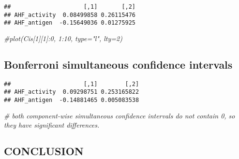 \documentclass[]{article}
\newenvironment{Shaded}{\begin{snugshade}}{\end{snugshade}}
\newcommand{\CommentTok}[1]{\textcolor[rgb]{0.56,0.35,0.01}{\textit{#1}}}
\newcommand{\DecValTok}[1]{\textcolor[rgb]{0.00,0.00,0.81}{#1}}
\newcommand{\KeywordTok}[1]{\textcolor[rgb]{0.13,0.29,0.53}{\textbf{#1}}}
\newcommand{\NormalTok}[1]{#1}
\newcommand{\OperatorTok}[1]{\textcolor[rgb]{0.81,0.36,0.00}{\textbf{#1}}}
\newcommand{\StringTok}[1]{\textcolor[rgb]{0.31,0.60,0.02}{#1}}
\begin{document}
\begin{verbatim}
##                     [,1]       [,2]
## AHF_activity  0.08499858 0.26115476
## AHF_antigen  -0.15649036 0.01275925
\end{verbatim}

\begin{Shaded}
\begin{Highlighting}[]
\CommentTok{#plot(Cis[1][1]:0, 1:10, type="l", lty=2)}
\end{Highlighting}
\end{Shaded}

\hypertarget{bonferroni-simultaneous-confidence-intervals}{%
\subsection{Bonferroni simultaneous confidence
intervals}\label{bonferroni-simultaneous-confidence-intervals}}

\begin{Shaded}
\end{Shaded}

\begin{verbatim}
##                     [,1]        [,2]
## AHF_activity  0.09298751 0.253165822
## AHF_antigen  -0.14881465 0.005083538
\end{verbatim}

\begin{Shaded}
\begin{Highlighting}[]
\CommentTok{# both component-wise simultaneous confidence intervals do not contain 0, so they have significant differences.}
\end{Highlighting}
\end{Shaded}

\hypertarget{conclusion}{%
\subsection{CONCLUSION}\label{conclusion}}
\end{document}
